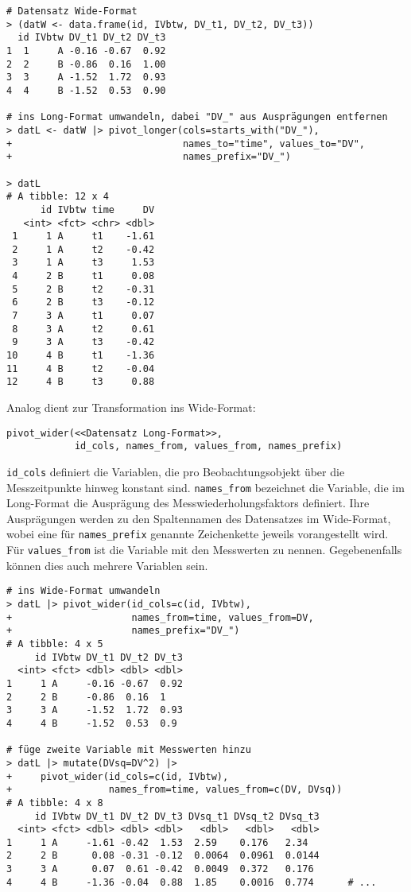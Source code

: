 \begin{lstlisting}
# Datensatz Wide-Format
> (datW <- data.frame(id, IVbtw, DV_t1, DV_t2, DV_t3))
  id IVbtw DV_t1 DV_t2 DV_t3
1  1     A -0.16 -0.67  0.92
2  2     B -0.86  0.16  1.00
3  3     A -1.52  1.72  0.93
4  4     B -1.52  0.53  0.90

# ins Long-Format umwandeln, dabei "DV_" aus Ausprägungen entfernen
> datL <- datW |> pivot_longer(cols=starts_with("DV_"),
+                              names_to="time", values_to="DV",
+                              names_prefix="DV_")

> datL
# A tibble: 12 x 4
      id IVbtw time     DV
   <int> <fct> <chr> <dbl>
 1     1 A     t1    -1.61
 2     1 A     t2    -0.42
 3     1 A     t3     1.53
 4     2 B     t1     0.08
 5     2 B     t2    -0.31
 6     2 B     t3    -0.12
 7     3 A     t1     0.07
 8     3 A     t2     0.61
 9     3 A     t3    -0.42
10     4 B     t1    -1.36
11     4 B     t2    -0.04
12     4 B     t3     0.88
\end{lstlisting}

Analog dient zur Transformation ins Wide-Format:
\begin{lstlisting}
pivot_wider(<<Datensatz Long-Format>>,
            id_cols, names_from, values_from, names_prefix)
\end{lstlisting}

\lstinline!id_cols! definiert die Variablen, die pro Beobachtungsobjekt über die Messzeitpunkte hinweg konstant sind. \lstinline!names_from! bezeichnet die Variable, die im Long-Format die Ausprägung des Messwiederholungsfaktors definiert. Ihre Ausprägungen werden zu den Spaltennamen des Datensatzes im Wide-Format, wobei eine für \lstinline!names_prefix! genannte Zeichenkette jeweils vorangestellt wird. Für \lstinline!values_from! ist die Variable mit den Messwerten zu nennen. Gegebenenfalls können dies auch mehrere Variablen sein.
\begin{lstlisting}
# ins Wide-Format umwandeln
> datL |> pivot_wider(id_cols=c(id, IVbtw),
+                     names_from=time, values_from=DV,
+                     names_prefix="DV_")
# A tibble: 4 x 5
     id IVbtw DV_t1 DV_t2 DV_t3
  <int> <fct> <dbl> <dbl> <dbl>
1     1 A     -0.16 -0.67  0.92
2     2 B     -0.86  0.16  1   
3     3 A     -1.52  1.72  0.93
4     4 B     -1.52  0.53  0.9

# füge zweite Variable mit Messwerten hinzu
> datL |> mutate(DVsq=DV^2) |>
+     pivot_wider(id_cols=c(id, IVbtw),
+                 names_from=time, values_from=c(DV, DVsq))
# A tibble: 4 x 8
     id IVbtw DV_t1 DV_t2 DV_t3 DVsq_t1 DVsq_t2 DVsq_t3
  <int> <fct> <dbl> <dbl> <dbl>   <dbl>   <dbl>   <dbl>
1     1 A     -1.61 -0.42  1.53  2.59    0.176   2.34  
2     2 B      0.08 -0.31 -0.12  0.0064  0.0961  0.0144
3     3 A      0.07  0.61 -0.42  0.0049  0.372   0.176 
4     4 B     -1.36 -0.04  0.88  1.85    0.0016  0.774      # ...
\end{lstlisting}

